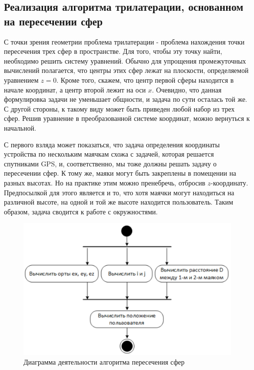 \subsection{Реализация алгоритма трилатерации, основанном на пересечении сфер}

С точки зрения геометрии проблема трилатерации - проблема нахождения точки пересечения трех сфер в пространстве. Для того, чтобы эту точку найти, необходимо решить систему уравнений. Обычно для упрощения промежуточных вычислений полагается, что центры этих сфер лежат на плоскости, определяемой уравнением $z=0$. Кроме того, скажем, что центр первой сферы находится в начале координат, а центр второй лежит на оси $x$. Очевидно, что данная формулировка задачи не уменьшает общности, и задача по сути осталась той же. С другой стороны, к такому виду может быть приведен любой набор из трех сфер. Решив уравнение в преобразованной системе координат, можно вернуться к начальной.

С первого взляда может показаться, что задача определения координаты устройства по нескольким маячкам схожа с задачей, которая решается спутниками GPS, и, соответственно, мы тоже должны решать задачу о пересечении сфер. К тому же, маяки могут быть закреплены в помещении на разных высотах. Но на практике этим можно пренебречь, отбросив $z$-координату. Предпосылкой для этого является и то, что хотя маячки могут находиться на различной высоте, на одной и той же высоте находится пользователь. Таким образом, задача сводится к работе с окружностями.

\begin{figure}
    \centering
    \includegraphics[scale=0.7]{img/sphereIntAct}
    \caption{Диаграмма деятельности алгоритма пересечения сфер}
\end{figure}
